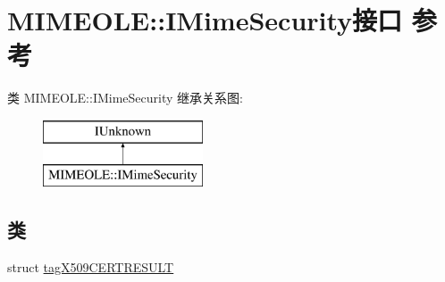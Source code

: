 \hypertarget{interface_m_i_m_e_o_l_e_1_1_i_mime_security}{}\section{M\+I\+M\+E\+O\+LE\+:\+:I\+Mime\+Security接口 参考}
\label{interface_m_i_m_e_o_l_e_1_1_i_mime_security}
类 M\+I\+M\+E\+O\+LE\+:\+:I\+Mime\+Security 继承关系图\+:\begin{figure}[H]
\begin{center}
\leavevmode
\includegraphics[height=2.000000cm]{interface_m_i_m_e_o_l_e_1_1_i_mime_security}
\end{center}
\end{figure}
\subsection*{类}
\begin{DoxyCompactItemize}
\item 
struct \hyperlink{struct_m_i_m_e_o_l_e_1_1_i_mime_security_1_1tag_x509_c_e_r_t_r_e_s_u_l_t}{tag\+X509\+C\+E\+R\+T\+R\+E\+S\+U\+LT}
\end{DoxyCompactItemize}

